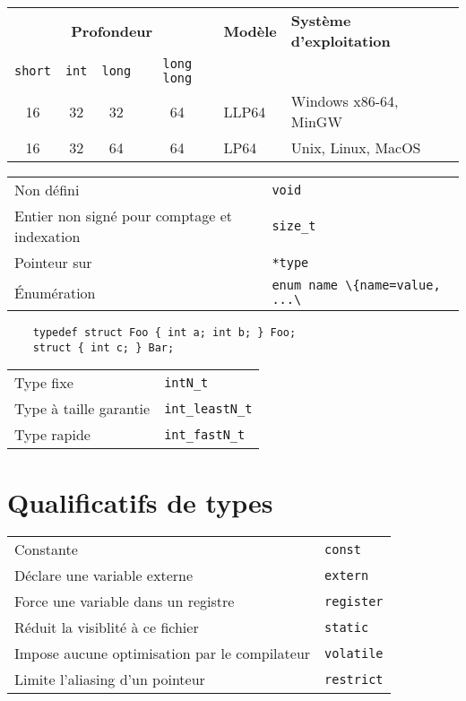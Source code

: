 \documentclass{article}
\newcommand{\cd}{\lstinline}
\begin{document}
\begin{multicols*}{3}
  \begin{tabularx}{\linewidth}{cccclX}
    \multicolumn{4}{c}{\bf Profondeur} & \bf Modèle & \bf Système d'exploitation \\
    \cd {short} & \cd{int} & \cd{long} & \cd{long long} & & \\
    \hline
    16 & 32 & 32 & 64 & LLP64 & Windows x86-64, MinGW \\
    16 & 32 & 64 & 64 & LP64 & Unix, Linux, MacOS
  \end{tabularx}

  \begin{tabularx}{\linewidth}{Xl}
    Non défini                 & \cd{void} \\
    Entier non signé pour comptage et indexation & \cd{size_t} \\
    Pointeur sur                       & \cd{*type} \\
    Énumération                        & \cd{enum name \{name=value, ...\}};
  \end{tabularx}

  \begin{lstlisting}
    typedef struct Foo { int a; int b; } Foo;
    struct { int c; } Bar;
  \end{lstlisting}

  \begin{tabularx}{\linewidth}{Xl}
  Type fixe & \cd{intN_t} \\
  Type à taille garantie & \cd{int_leastN_t} \\
  Type rapide & \cd{int_fastN_t}
  \end{tabularx}

\section*{Qualificatifs de types}

\begin{tabularx}{\linewidth}{Xl}
  Constante                           & \cd{const} \\
  Déclare une variable externe        & \cd{extern} \\
  Force une variable dans un registre & \cd{register} \\
  Réduit la visiblité à ce fichier    & \cd{static} \\
  Impose aucune optimisation par le compilateur & \cd{volatile} \\
  Limite l'aliasing d'un pointeur     & \cd{restrict} \\
\end{tabularx}


\end{multicols*}
\end{document}
